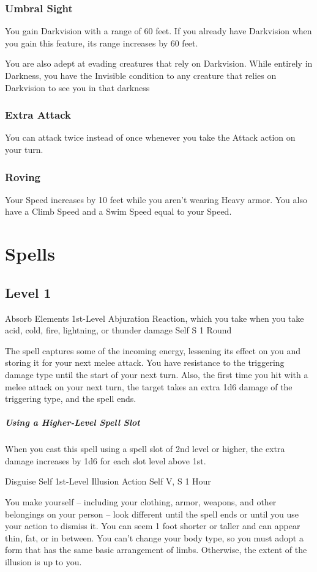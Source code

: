 \documentclass[letterpaper,openany,oneside,twocolumn]{book}
\begin{document}
\subsubsection*{Umbral Sight}
You gain Darkvision with a range of 60 feet. If you already have Darkvision when you gain this feature, its range increases by 60 feet.

You are also adept at evading creatures that rely on Darkvision. While entirely in Darkness, you have the Invisible condition to any creature that relies on Darkvision to see you in that darkness
\subsubsection*{Extra Attack}
You can attack twice instead of once whenever you take the Attack action on your turn.
\subsubsection*{Roving}
Your Speed increases by 10 feet while you aren't wearing Heavy armor. You also have a Climb Speed and a Swim Speed equal to your Speed.

\section*{Spells}
\subsection*{Level 1}

\DndSpellHeader
  {Absorb Elements}
  {1st-Level Abjuration}
  {Reaction, which you take when you take acid, cold, fire, lightning, or thunder damage}
  {Self}
  {S}
  {1 Round}

The spell captures some of the incoming energy, lessening its effect on you and storing it for your next melee attack. You have resistance to the triggering damage type until the start of your next turn. Also, the first time you hit with a melee attack on your next turn, the target takes an extra 1d6 damage of the triggering type, and the spell ends.

\subparagraph*{Using a Higher-Level Spell Slot} When you cast this spell using a spell slot of 2nd level or higher, the extra damage increases by 1d6 for each slot level above 1st.

\DndSpellHeader
  {Disguise Self}
  {1st-Level Illusion}
  {Action}
  {Self}
  {V, S}
  {1 Hour}

You make yourself – including your clothing, armor, weapons, and other belongings on your person – look different until the spell ends or until you use your action to dismiss it. You can seem 1 foot shorter or taller and can appear thin, fat, or in between. You can't change your body type, so you must adopt a form that has the same basic arrangement of limbs. Otherwise, the extent of the illusion is up to you.
\end{document}
